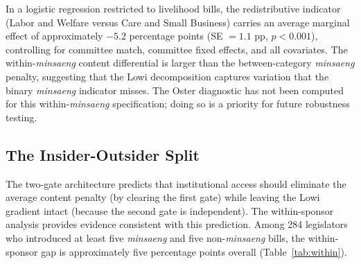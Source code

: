 \documentclass[11pt]{article}
\begin{document}
In a logistic regression restricted to livelihood bills, the redistributive indicator (Labor and Welfare versus Care and Small Business) carries an average marginal effect of approximately $-5.2$ percentage points (SE $= 1.1$ pp, $p < 0.001$), controlling for committee match, committee fixed effects, and all covariates. The within-\emph{minsaeng} content differential is larger than the between-category \emph{minsaeng} penalty, suggesting that the Lowi decomposition captures variation that the binary \emph{minsaeng} indicator misses. The Oster diagnostic has not been computed for this within-\emph{minsaeng} specification; doing so is a priority for future robustness testing.

\subsection{The Insider-Outsider Split}\label{sec:insider}

The two-gate architecture predicts that institutional access should eliminate the average content penalty (by clearing the first gate) while leaving the Lowi gradient intact (because the second gate is independent). The within-sponsor analysis provides evidence consistent with this prediction. Among 284 legislators who introduced at least five \emph{minsaeng} and five non-\emph{minsaeng} bills, the within-sponsor gap is approximately five percentage points overall (Table~\ref{tab:within}).
\end{document}
